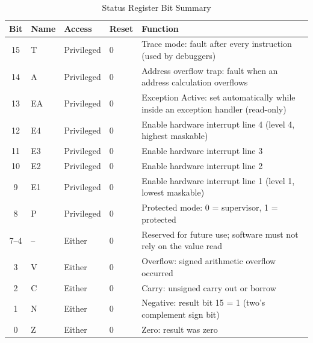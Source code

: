 \begin{table}[H]
	\centering
	\small
	\begin{tabular}{clllp{6cm}}
		\toprule
		\textbf{Bit} & \textbf{Name} & \textbf{Access} & \textbf{Reset} & \textbf{Function}                                                                 \\
		\midrule
		15           & T             & Privileged      & 0              & Trace mode: fault after every instruction (used by debuggers)                     \\
		14           & A             & Privileged      & 0              & Address overflow trap: fault when an address calculation overflows                \\
		13           & EA            & Privileged      & 0              & Exception Active: set automatically while inside an exception handler (read-only) \\
		12           & E4            & Privileged      & 0              & Enable hardware interrupt line 4 (level 4, highest maskable)                      \\
		11           & E3            & Privileged      & 0              & Enable hardware interrupt line 3                                                  \\
		10           & E2            & Privileged      & 0              & Enable hardware interrupt line 2                                                  \\
		9            & E1            & Privileged      & 0              & Enable hardware interrupt line 1 (level 1, lowest maskable)                       \\
		8            & P             & Privileged      & 0              & Protected mode: 0 = supervisor, 1 = protected                                     \\
		\midrule
		7--4         & --            & Either          & 0              & Reserved for future use; software must not rely on the value read                 \\
		\midrule
		3            & V             & Either          & 0              & Overflow: signed arithmetic overflow occurred                                     \\
		2            & C             & Either          & 0              & Carry: unsigned carry out or borrow                                               \\
		1            & N             & Either          & 0              & Negative: result bit 15 = 1 (two's complement sign bit)                           \\
		0            & Z             & Either          & 0              & Zero: result was zero                                                             \\
		\bottomrule
	\end{tabular}
	\caption{Status Register Bit Summary}
	\label{tab:sr-bit-summary}
\end{table}

